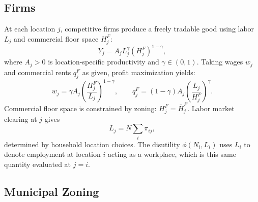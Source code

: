\documentclass[12pt, a4paper]{article}
\theoremstyle{definition}
\begin{document}
\subsection{Firms}

At each location $j$, competitive firms produce a freely tradable good using labor $L_j$ and commercial floor space $H_j^F$:
\[
Y_j = A_j L_j^{\gamma}(H_j^F)^{1-\gamma},
\]
where $A_j > 0$ is location-specific productivity and $\gamma \in (0,1)$. Taking wages $w_j$ and commercial rents $q_j^F$ as given, profit maximization yields:
\[
w_j = \gamma A_j \!\left(\frac{H_j^F}{L_j}\right)^{\!1-\gamma}\!, \qquad
q_j^F = (1-\gamma) A_j \!\left(\frac{L_j}{H_j^F}\right)^{\!\gamma}\!.
\]
Commercial floor space is constrained by zoning: $H_j^F = \bar{H}_j^F$. Labor market clearing at $j$ gives
\[
L_j = N \sum_i \pi_{ij},
\]
determined by household location choices. The disutility $\phi(N_i, L_i)$ uses $L_i$ to denote employment at location $i$ acting as a workplace, which is this same quantity evaluated at $j = i$.

\subsection{Municipal Zoning}
\end{document}
